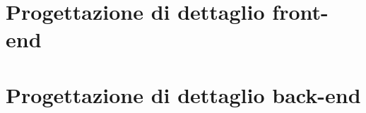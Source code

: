 \section{Progettazione di dettaglio front-end}




\section{Progettazione di dettaglio back-end}





